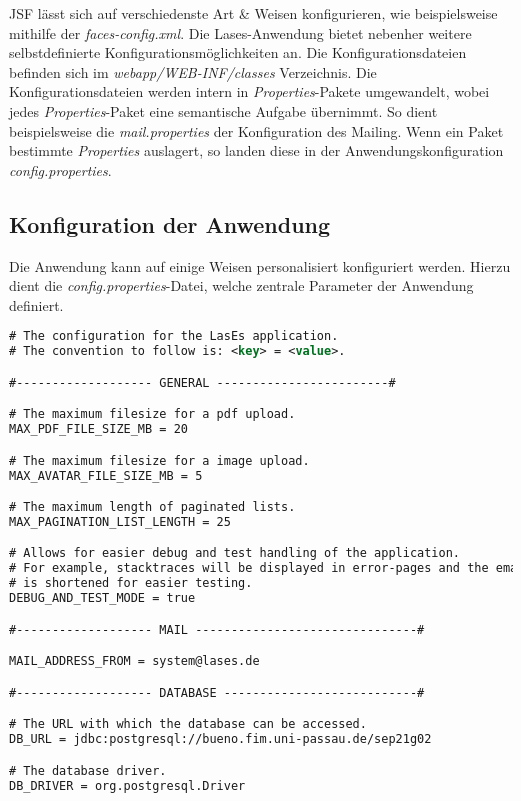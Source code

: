 
JSF lässt sich auf verschiedenste Art \& Weisen konfigurieren, wie beispielsweise
mithilfe der \emph{faces-config.xml}.
Die Lases-Anwendung bietet nebenher weitere selbstdefinierte Konfigurationsmöglichkeiten an.
Die Konfigurationsdateien befinden sich im \emph{webapp/WEB-INF/classes} Verzeichnis.
\newline\newline
Die Konfigurationsdateien werden intern in \emph{Properties}-Pakete umgewandelt,
wobei jedes \emph{Properties}-Paket eine semantische Aufgabe übernimmt.
So dient beispielsweise die \emph{mail.properties} der Konfiguration des Mailing.
Wenn ein Paket bestimmte \emph{Properties} auslagert,
so landen diese in der Anwendungskonfiguration \emph{config.properties}.

\subsection{Konfiguration der Anwendung}
Die Anwendung kann auf einige Weisen personalisiert konfiguriert werden.
Hierzu dient die \emph{config.properties}-Datei,
welche zentrale Parameter der Anwendung definiert.

\begin{lstlisting}[language=XML, caption = Die Anwendungskonfiguration \emph{config.properties}]
# The configuration for the LasEs application.
# The convention to follow is: <key> = <value>.

#------------------- GENERAL ------------------------#

# The maximum filesize for a pdf upload.
MAX_PDF_FILE_SIZE_MB = 20

# The maximum filesize for a image upload.
MAX_AVATAR_FILE_SIZE_MB = 5

# The maximum length of paginated lists.
MAX_PAGINATION_LIST_LENGTH = 25

# Allows for easier debug and test handling of the application.
# For example, stacktraces will be displayed in error-pages and the email-verification process
# is shortened for easier testing.
DEBUG_AND_TEST_MODE = true

#------------------- MAIL -------------------------------#

MAIL_ADDRESS_FROM = system@lases.de

#------------------- DATABASE ---------------------------#

# The URL with which the database can be accessed.
DB_URL = jdbc:postgresql://bueno.fim.uni-passau.de/sep21g02

# The database driver.
DB_DRIVER = org.postgresql.Driver
\end{lstlisting}

